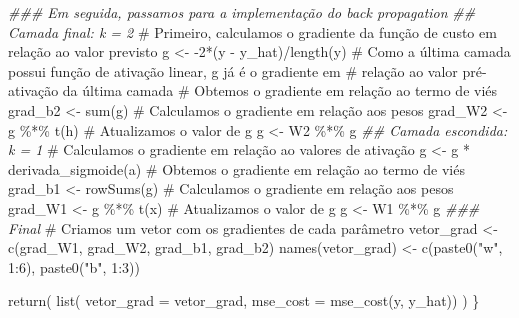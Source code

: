 \documentclass[
  a4paperpaper,
]{article}
\newenvironment{Shaded}{\begin{snugshade}}{\end{snugshade}}
\newcommand{\AttributeTok}[1]{\textcolor[rgb]{0.40,0.45,0.13}{#1}}
\newcommand{\CommentTok}[1]{\textcolor[rgb]{0.37,0.37,0.37}{#1}}
\newcommand{\DecValTok}[1]{\textcolor[rgb]{0.68,0.00,0.00}{#1}}
\newcommand{\DocumentationTok}[1]{\textcolor[rgb]{0.37,0.37,0.37}{\textit{#1}}}
\newcommand{\FunctionTok}[1]{\textcolor[rgb]{0.28,0.35,0.67}{#1}}
\newcommand{\NormalTok}[1]{\textcolor[rgb]{0.00,0.23,0.31}{#1}}
\newcommand{\OtherTok}[1]{\textcolor[rgb]{0.00,0.23,0.31}{#1}}
\newcommand{\SpecialCharTok}[1]{\textcolor[rgb]{0.37,0.37,0.37}{#1}}
\newcommand{\StringTok}[1]{\textcolor[rgb]{0.13,0.47,0.30}{#1}}
\begin{document}
\begin{Shaded}
\begin{Highlighting}[]
  \DocumentationTok{\#\#\# Em seguida, passamos para a implementação do back propagation}
  \DocumentationTok{\#\# Camada final: k = 2}
  \CommentTok{\# Primeiro, calculamos o gradiente da função de custo em relação ao valor previsto}
\NormalTok{  g }\OtherTok{\textless{}{-}} \SpecialCharTok{{-}}\DecValTok{2}\SpecialCharTok{*}\NormalTok{(y }\SpecialCharTok{{-}}\NormalTok{ y\_hat)}\SpecialCharTok{/}\FunctionTok{length}\NormalTok{(y)}
  \CommentTok{\# Como a última camada possui função de ativação linear, g já é o gradiente em}
  \CommentTok{\# relação ao valor pré{-}ativação da última camada}
  \CommentTok{\# Obtemos o gradiente em relação ao termo de viés}
\NormalTok{  grad\_b2 }\OtherTok{\textless{}{-}} \FunctionTok{sum}\NormalTok{(g)}
  \CommentTok{\# Calculamos o gradiente em relação aos pesos}
\NormalTok{  grad\_W2 }\OtherTok{\textless{}{-}}\NormalTok{ g }\SpecialCharTok{\%*\%} \FunctionTok{t}\NormalTok{(h)}
  \CommentTok{\# Atualizamos o valor de g}
\NormalTok{  g }\OtherTok{\textless{}{-}}\NormalTok{ W2 }\SpecialCharTok{\%*\%}\NormalTok{ g}
  \DocumentationTok{\#\# Camada escondida: k = 1}
  \CommentTok{\# Calculamos o gradiente em relação ao valores de ativação}
\NormalTok{  g }\OtherTok{\textless{}{-}}\NormalTok{ g }\SpecialCharTok{*} \FunctionTok{derivada\_sigmoide}\NormalTok{(a)}
  \CommentTok{\# Obtemos o gradiente em relação ao termo de viés}
\NormalTok{  grad\_b1 }\OtherTok{\textless{}{-}} \FunctionTok{rowSums}\NormalTok{(g)}
  \CommentTok{\# Calculamos o gradiente em relação aos pesos}
\NormalTok{  grad\_W1 }\OtherTok{\textless{}{-}}\NormalTok{ g }\SpecialCharTok{\%*\%} \FunctionTok{t}\NormalTok{(x)}
  \CommentTok{\# Atualizamos o valor de g}
\NormalTok{  g }\OtherTok{\textless{}{-}}\NormalTok{ W1 }\SpecialCharTok{\%*\%}\NormalTok{ g}
  \DocumentationTok{\#\#\# Final}
  \CommentTok{\# Criamos um vetor com os gradientes de cada parâmetro}
\NormalTok{  vetor\_grad }\OtherTok{\textless{}{-}} \FunctionTok{c}\NormalTok{(grad\_W1, grad\_W2, grad\_b1, grad\_b2)}
  \FunctionTok{names}\NormalTok{(vetor\_grad) }\OtherTok{\textless{}{-}} \FunctionTok{c}\NormalTok{(}\FunctionTok{paste0}\NormalTok{(}\StringTok{"w"}\NormalTok{, }\DecValTok{1}\SpecialCharTok{:}\DecValTok{6}\NormalTok{), }\FunctionTok{paste0}\NormalTok{(}\StringTok{"b"}\NormalTok{, }\DecValTok{1}\SpecialCharTok{:}\DecValTok{3}\NormalTok{))}
  
  \FunctionTok{return}\NormalTok{(}
    \FunctionTok{list}\NormalTok{(}
      \AttributeTok{vetor\_grad =}\NormalTok{ vetor\_grad,}
      \AttributeTok{mse\_cost =} \FunctionTok{mse\_cost}\NormalTok{(y, y\_hat))}
\NormalTok{    )}
\NormalTok{\}}
\end{Highlighting}
\end{Shaded}
\end{document}
